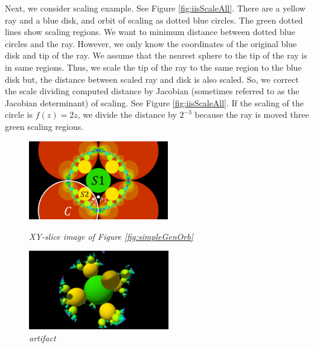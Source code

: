 Next, we consider scaling example.
See Figure \ref{fig:iisScaleAll}.
There are a yellow ray and a blue disk, and orbit of scaling as
dotted blue circles.
The green dotted lines show scaling regions.
We want to minimum distance between dotted blue circles and the ray.
However, we only know the coordinates of the original blue
disk and tip of the ray.
We assume that the nearest sphere to the tip of the ray is in
same regions. 
Thus, we scale the tip of the ray to the same region to the blue disk
but, the distance between scaled ray and disk is also scaled.
So, we correct the scale dividing computed distance by 
Jacobian (sometimes referred to as the Jacobian determinant) of scaling.
See Figure \ref{fig:iisScaleAll}.
If the scaling of the circle is $f(z) = 2z$, we divide the distance by
$2^{-3}$ because the ray is moved three green scaling regions.


\begin{figure}[htbp]
 \begin{minipage}[t]{0.5\hsize}
  \center
  \includegraphics[height=1.35in, keepaspectratio]{img/preparation/slice.png}
  \caption{\textit{XY-slice image of Figure \ref{fig:simpleGenOrb}}}
  \label{fig:slice2d}
  \hspace*{\fill}
 \end{minipage}
 \begin{minipage}[t]{0.5\hsize}
  \center
  \includegraphics[height=1.35in, keepaspectratio]{img/preparation/artifact.pdf}
  \caption{\textit{artifact}}
  \label{fig:3dartifact}
  \hspace*{\fill}
 \end{minipage}
\end{figure}

